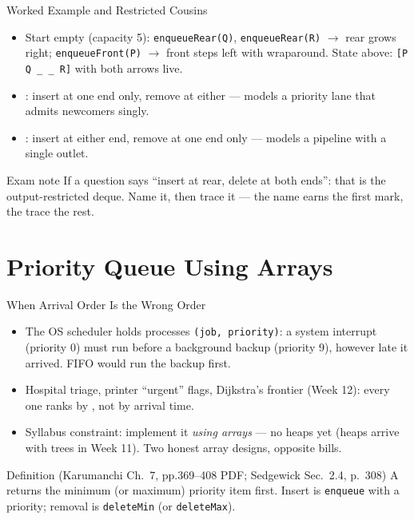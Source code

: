 \documentclass[aspectratio=169]{beamer}
\begin{document}
\begin{frame}{Worked Example and Restricted Cousins}
  \begin{itemize}
    \item Start empty (capacity 5): \texttt{enqueueRear(Q)},
      \texttt{enqueueRear(R)} $\to$ rear grows right;
      \texttt{enqueueFront(P)} $\to$ front steps left with wraparound.
      State above: \texttt{[P Q \_ \_ R]} with both arrows live.
    \item {}: insert at one end only, remove at
      either --- models a priority lane that admits newcomers singly.
    \item {}: insert at either end, remove at one
      end only --- models a pipeline with a single outlet.
  \end{itemize}
  \begin{exampleblock}{Exam note}
    If a question says ``insert at rear, delete at both ends'': that is the
    output-restricted deque. Name it, then trace it --- the name earns the
    first mark, the trace the rest.
  \end{exampleblock}
\end{frame}


\section{Priority Queue Using Arrays}


\begin{frame}{When Arrival Order Is the Wrong Order}
  \begin{itemize}
    \item The OS scheduler holds processes \texttt{(job, priority)}: a system
      interrupt (priority 0) must run before a background backup (priority
      9), however late it arrived. FIFO would run the backup first.
    \item Hospital triage, printer ``urgent'' flags, Dijkstra's frontier
      (Week 12): every one ranks by , not by arrival time.
    \item Syllabus constraint: implement it \emph{using arrays} --- no heaps
      yet (heaps arrive with trees in Week 11). Two honest array designs,
      opposite bills.
  \end{itemize}
  \begin{exampleblock}{Definition (Karumanchi Ch.~7, pp.369--408 PDF;
    Sedgewick Sec.~2.4, p.~308)
    \cite{Karumanchi2017_data_structures_algorithms_made_easy,Sedgewick2011_algorithms}}
    A  returns the minimum (or maximum) priority item
    first. Insert is \texttt{enqueue} with a priority; removal is
    \texttt{deleteMin} (or \texttt{deleteMax}).
  \end{exampleblock}
\end{frame}
\end{document}
